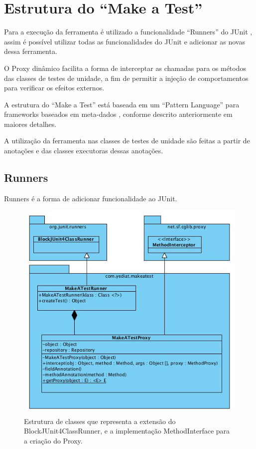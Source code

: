 \documentclass{abnt}
\begin{document}
\section{Estrutura do ``Make a Test''}

Para a execução da ferramenta é utilizado a funcionalidade ``Runners'' do JUnit \cite{junit}, assim é possível utilizar todas as funcionalidades do JUnit e adicionar as novas dessa ferramenta.

O Proxy dinâmico facilita a forma de interceptar as chamadas para os métodos das classes de testes de unidade, a fim de permitir a injeção de comportamentos para verificar os efeitos externos.

A estrutura do ``Make a Test'' está baseada em um ``Pattern Language'' para frameworks baseados em meta-dados \cite{GUERRA-PATTERN}, conforme descrito anteriormente em maiores detalhes.

A utilização da ferramenta nas classes de testes de unidade são feitas a partir de anotações e das classes executoras dessas anotações.

\subsection{Runners}

Runners é a forma de adicionar funcionalidade ao JUnit.

\begin{figure}[!ht]
	\centering
	\includegraphics[scale=0.50]{uml/runners.jpg}
	\caption{Estrutura de classes que representa a extensão do BlockJUnit4ClassRunner, e a implementação MethodInterface para a criação do Proxy.}
	\label{uml-class-runners}
\end{figure}
\end{document}
